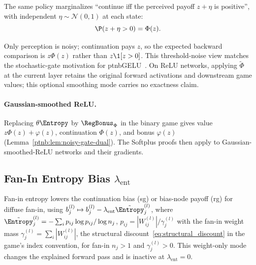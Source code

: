 \begin{remark}\label{ptnb:rem:noisy-gate-perception}
The same policy marginalizes ``continue iff the perceived payoff $z+\eta$ is positive'', with
independent $\eta\sim\mathcal N(0,1)$ at each state:
\begin{equation}\label{ptnb:eq:noisy-gate-marginal}
    \P(z+\eta>0)=\Phi(z).
\end{equation}
{\setlength{\emergencystretch}{1em}%
Only perception is noisy; continuation pays $z$, so the expected backward comparison is
$z\Phi(z)$ rather than $z\1[z>0]$. This threshold-noise view matches the stochastic-gate motivation
for \acs{ptnbGELU}~\parencite{Hendrycks2016}. On ReLU networks, applying $\tilde\Phi$ at the current
layer retains the original forward activations and downstream game values; this optional smoothing
mode carries no exactness claim.\par}
\end{remark}

\paragraph{Gaussian-smoothed ReLU.}
Replacing $\theta\Entropy$ by $\RegBonus_\Phi$ in the binary game gives value $z\Phi(z)+\varphi(z)$, continuation $\Phi(z)$, and bonus $\varphi(z)$ (Lemma~\ref{ptnb:lem:noisy-gate-dual}). The Softplus proofs then apply to Gaussian-smoothed-ReLU networks and their gradients.


\subsection{\texorpdfstring{Fan-In Entropy Bias $\lambda_{\mathrm{ent}}$}{Fan-In Entropy Bias lambda\_ent}}\label{ptnb:app:entropy-mode}

Fan-in entropy lowers the continuation bias (\ac{sg}) or bias-node payoff (\ac{rg}) for diffuse
fan-in, using $b_j^{(l)}\mapsto b_j^{(l)}-\lambda_{\mathrm{ent}}\tilde{\Entropy}_j^{(l)}$, where
$\tilde{\Entropy}_j^{(l)}=-\sum_i p_{ij}\log p_{ij}/\log n_j$,
$p_{ij}=|W_{ij}^{(l)}|/\gamma_j^{(l)}$ with the fan-in weight mass $\gamma_j^{(l)}=\sum_i|W_{ij}^{(l)}|$, the structural discount~\eqref{eq:structural_discount} in the game's index convention, for fan-in $n_j>1$ and $\gamma_j^{(l)}>0$. This weight-only mode changes the explained forward pass and is inactive at $\lambda_{\mathrm{ent}}=0$.

